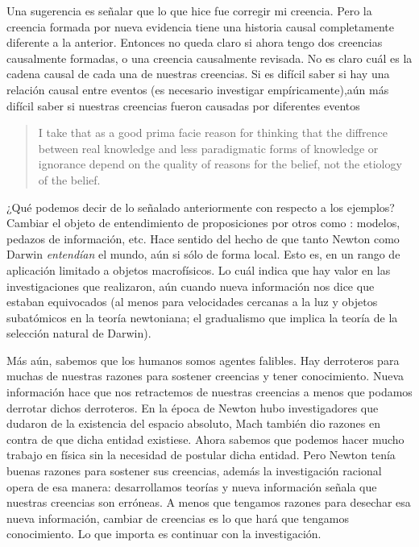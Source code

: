 \documentclass{article}
\begin{document}
Una sugerencia es señalar que lo que hice fue corregir mi creencia. Pero la creencia formada por nueva evidencia tiene una historia causal completamente diferente a la anterior. Entonces no queda claro si ahora tengo dos creencias causalmente formadas, o una creencia causalmente revisada. No es claro cuál es la cadena causal de cada una de nuestras creencias. Si es difícil saber si hay una relación causal entre eventos (es necesario investigar empíricamente),aún más difícil saber si nuestras creencias fueron causadas por diferentes eventos 

\begin{quote}
I take that as a good prima facie reason for thinking that the diffrence between real knowledge and less paradigmatic forms of knowledge or ignorance depend on the quality of reasons for the belief, not the etiology of the belief. \cite[p~.403]{Klein2019}
\end{quote}

¿Qué podemos decir de lo señalado anteriormente con respecto a los ejemplos? Cambiar el objeto de entendimiento de proposiciones por otros como : modelos, pedazos de información, etc. Hace sentido del hecho de que tanto Newton como Darwin \textit{entendían} el mundo, aún si sólo de forma local. Esto es, en un rango de aplicación limitado a objetos macrofísicos. Lo cuál indica que hay valor en las investigaciones que realizaron, aún cuando nueva información nos dice que estaban equivocados (al menos para velocidades cercanas a la luz y objetos subatómicos en la teoría newtoniana; el gradualismo que implica la teoría de la selección natural de Darwin). 

Más aún, sabemos que los humanos somos agentes falibles. Hay derroteros para muchas de nuestras razones para sostener creencias y tener conocimiento. Nueva información hace que nos retractemos de nuestras creencias a menos que podamos derrotar dichos derroteros. En la época de Newton hubo investigadores que dudaron de la existencia del espacio absoluto, Mach también dio razones en contra de que dicha entidad existiese. Ahora sabemos que podemos hacer mucho trabajo en física sin la necesidad de postular dicha entidad. Pero Newton tenía buenas razones para sostener sus creencias, además la investigación racional opera de esa manera: desarrollamos teorías y nueva información señala que nuestras creencias son erróneas. A menos que tengamos razones para desechar esa nueva información, cambiar de creencias es lo que hará que tengamos conocimiento. Lo que importa es continuar con la investigación.
\end{document}
